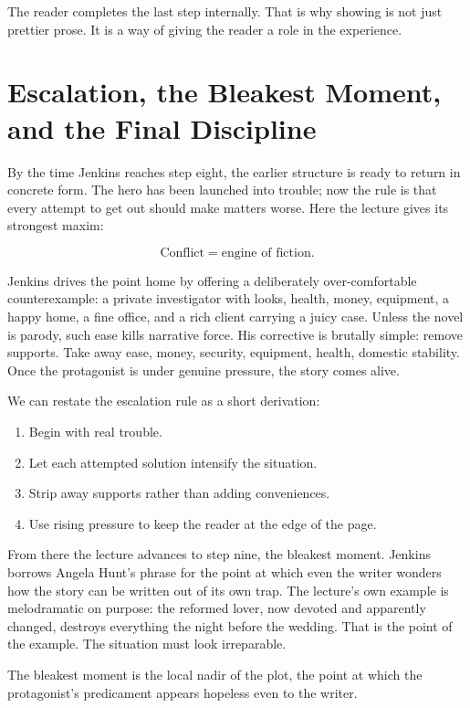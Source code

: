 The reader completes the last step internally. That is why showing is not just prettier prose. It is a way of giving the reader a role in the experience.

\section{Escalation, the Bleakest Moment, and the Final Discipline}

By the time Jenkins reaches step eight, the earlier structure is ready to return in concrete form. The hero has been launched into trouble; now the rule is that every attempt to get out should make matters worse. Here the lecture gives its strongest maxim:

\begin{equation}
\text{Conflict}=\text{engine of fiction}.
\end{equation}

Jenkins drives the point home by offering a deliberately over-comfortable counterexample: a private investigator with looks, health, money, equipment, a happy home, a fine office, and a rich client carrying a juicy case. Unless the novel is parody, such ease kills narrative force. His corrective is brutally simple: remove supports. Take away ease, money, security, equipment, health, domestic stability. Once the protagonist is under genuine pressure, the story comes alive.

We can restate the escalation rule as a short derivation:

\begin{enumerate}
\item Begin with real trouble.
\item Let each attempted solution intensify the situation.
\item Strip away supports rather than adding conveniences.
\item Use rising pressure to keep the reader at the edge of the page.
\end{enumerate}

From there the lecture advances to step nine, the bleakest moment. Jenkins borrows Angela Hunt's phrase for the point at which even the writer wonders how the story can be written out of its own trap. The lecture's own example is melodramatic on purpose: the reformed lover, now devoted and apparently changed, destroys everything the night before the wedding. That is the point of the example. The situation must look irreparable.

\begin{definition}
The bleakest moment is the local nadir of the plot, the point at which the protagonist's predicament appears hopeless even to the writer.
\end{definition}

